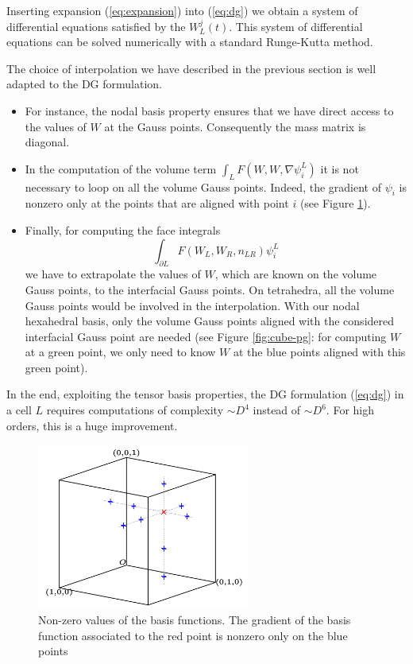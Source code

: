 \documentclass[preprint]{sig-alternate}
\begin{document}
Inserting expansion (\ref{eq:expansion}) into (\ref{eq:dg}) we obtain a system of differential equations satisfied by the
$W_{L}^{j}(t)$. This system of differential equations can be solved numerically with a standard Runge-Kutta method.

The choice of interpolation we have described in the previous section is well adapted to the DG formulation.
\begin{itemize}
\item
For instance, the nodal basis property ensures that we have direct access to the values of $W$ at the Gauss points. Consequently the mass matrix is diagonal.

\item In the computation of the volume term $ \int_{L}F(W,W,\nabla\psi_{i}^{L})$ it is not necessary to loop on all the volume Gauss points. Indeed, the gradient of $\psi_{i}$ is nonzero only at the points that are aligned with point $i$ (see Figure \ref{fig:cross}).


\item Finally, for computing the face integrals $$\int_{\partial L}F(W_{L},W_{R},n_{LR})\psi_{i}^{L}$$ we have to extrapolate the values of $W$, which are known on the volume Gauss points, to the interfacial Gauss points. On tetrahedra, all the volume Gauss points would be involved in the interpolation. With our nodal hexahedral basis, only the volume Gauss points aligned with the considered interfacial Gauss point are needed (see Figure \ref{fig:cube-pg}: for computing $W$ at a green point, we only need to know $W$ at the blue points aligned with this green point).
\end{itemize}

In the end, exploiting the tensor basis properties, the DG formulation (\ref{eq:dg}) in a cell $L$ requires computations of complexity $\sim D^4$ instead of $\sim D^6$. For high orders, this is a huge improvement.

\begin{figure}[h]
  \centering
  \includegraphics[width=7cm]{ref_element_cross_pg}
  \caption{Non-zero values of the basis functions. The gradient of the basis function associated to the red point is nonzero only on the blue points}
  \label{fig:cross}
\end{figure}
\end{document}
